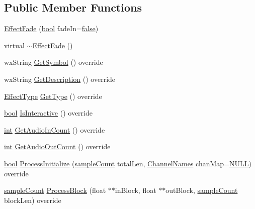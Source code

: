 \subsection*{Public Member Functions}
\begin{DoxyCompactItemize}
\item 
\hyperlink{class_effect_fade_a650855ec00b6ceb79cc5d0e9a970d05d}{Effect\+Fade} (\hyperlink{mac_2config_2i386_2lib-src_2libsoxr_2soxr-config_8h_abb452686968e48b67397da5f97445f5b}{bool} fade\+In=\hyperlink{mac_2config_2i386_2lib-src_2libsoxr_2soxr-config_8h_a65e9886d74aaee76545e83dd09011727}{false})
\item 
virtual \hyperlink{class_effect_fade_a729d0523ddfb7a71a0537950764462d8}{$\sim$\+Effect\+Fade} ()
\item 
wx\+String \hyperlink{class_effect_fade_ab31240fc56e63e3be37576118beb7366}{Get\+Symbol} () override
\item 
wx\+String \hyperlink{class_effect_fade_a020b54bd3c56585f230c70073dbfc2e7}{Get\+Description} () override
\item 
\hyperlink{_effect_interface_8h_a4809a7bb3fd1a421902a667cc1405d43}{Effect\+Type} \hyperlink{class_effect_fade_a627e5919b5302ccdaf6c4d5830b0cbe8}{Get\+Type} () override
\item 
\hyperlink{mac_2config_2i386_2lib-src_2libsoxr_2soxr-config_8h_abb452686968e48b67397da5f97445f5b}{bool} \hyperlink{class_effect_fade_a60e535f5edb95e4dd78079a705399898}{Is\+Interactive} () override
\item 
\hyperlink{xmltok_8h_a5a0d4a5641ce434f1d23533f2b2e6653}{int} \hyperlink{class_effect_fade_a8d39ed5be4860bb2f9b6cdefcccd046f}{Get\+Audio\+In\+Count} () override
\item 
\hyperlink{xmltok_8h_a5a0d4a5641ce434f1d23533f2b2e6653}{int} \hyperlink{class_effect_fade_a711116d02de38c948f405cca4bcc52b5}{Get\+Audio\+Out\+Count} () override
\item 
\hyperlink{mac_2config_2i386_2lib-src_2libsoxr_2soxr-config_8h_abb452686968e48b67397da5f97445f5b}{bool} \hyperlink{class_effect_fade_acb80f8b939c65255319931e35dbfa318}{Process\+Initialize} (\hyperlink{include_2audacity_2_types_8h_afa427e1f521ea5ec12d054e8bd4d0f71}{sample\+Count} total\+Len, \hyperlink{include_2audacity_2_types_8h_a4f0f42a04250c39bbe0ce6cb26aa3b48}{Channel\+Names} chan\+Map=\hyperlink{px__mixer_8h_a070d2ce7b6bb7e5c05602aa8c308d0c4}{N\+U\+LL}) override
\item 
\hyperlink{include_2audacity_2_types_8h_afa427e1f521ea5ec12d054e8bd4d0f71}{sample\+Count} \hyperlink{class_effect_fade_a241197f0ae736e75b34b08d9367ede1a}{Process\+Block} (float $\ast$$\ast$in\+Block, float $\ast$$\ast$out\+Block, \hyperlink{include_2audacity_2_types_8h_afa427e1f521ea5ec12d054e8bd4d0f71}{sample\+Count} block\+Len) override
\end{DoxyCompactItemize}
